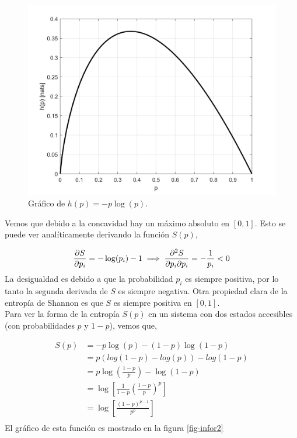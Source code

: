 \documentclass[executivepaper,12pt]{article}
\numberwithin{equation}{section}
\begin{document}
\begin{figure}[H]
	\begin{center}
		\includegraphics[scale=1]{entropyConc}
	\end{center}
	\caption{Gráfico de $h(p)=-p\log(p)$.}
	\label{fig-infor1}
\end{figure}

Vemos que debido a la concavidad hay un máximo absoluto en $[0,1]$. Esto se puede ver analíticamente derivando la función $S(p)$,

\begin{equation*}
	\pdv{S}{p_i}=-\log(p_i)-1\implies \pdv[2]{S}{p_i}{p_i}=-\frac{1}{p_i}<0 
\end{equation*}
La desigualdad es debido a que la probabilidad $p_i$ es siempre positiva, por lo tanto la segunda derivada de $S$ es siempre negativa. Otra propiedad clara de la entropía de Shannon es que $S$ es siempre positiva en $[0,1]$. \\
Para ver la forma de la entropía $S(p)$ en un sistema con dos estados accesibles (con probabilidades $p$ y $1-p$), vemos que,

\begin{align*}
	S(p)&=-p\log(p)-(1-p)\log(1-p)\\
	&=p(log(1-p)-log(p))-log(1-p)\\
	&=p\log(\frac{1-p}{p})-\log(1-p)\\
	&=\log\left[\frac{1}{1-p}\left(\frac{1-p}{p}\right)^p\right]\\
	&=\log\left[\frac{(1-p)^{p-1}}{p^p}\right]\\
\end{align*}
El gráfico de esta función es mostrado en la figura \ref{fig-infor2}
\end{document}
